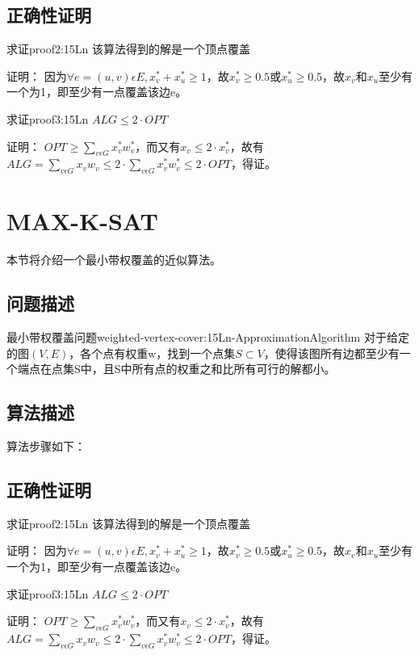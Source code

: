 \subsection{正确性证明}

\begin{proposition}{求证}{proof2:15Ln}
	该算法得到的解是一个顶点覆盖
\end{proposition}
证明：
	因为$\forall e=(u,v)\epsilon E,x_v^*+x_u^*\geqslant 1$，故$x_v^*\geqslant 0.5$或$x_u^*\geqslant 0.5$，故$x_v$和$x_u$至少有一个为1，即至少有一点覆盖该边e。
\begin{proposition}{求证}{proof3:15Ln}
	$ALG\leqslant 2\cdot OPT$
\end{proposition}
证明：
	$OPT\geqslant \sum_{v\epsilon G} x_v^*w_v^*$，而又有$x_v\leqslant 2\cdot x_v^*$，故有
	$ALG=\sum_{v\epsilon G} x_vw_v\leqslant 2\cdot \sum_{v\epsilon G} x_v^*w_v^*\leqslant 2\cdot OPT$，得证。

\section{MAX-K-SAT}


本节将介绍一个最小带权覆盖的近似算法。

\subsection{问题描述}

\begin{definition}{最小带权覆盖问题}{weighted-vertex-cover:15Ln-ApproximationAlgorithm}
	对于给定的图$(V,E)$，各个点有权重w，找到一个点集$S\subset V$，使得该图所有边都至少有一个端点在点集S中，且S中所有点的权重之和比所有可行的解都小。
\end{definition}

\subsection{算法描述}

算法步骤如下：
\begin{enumerate}
	
\end{enumerate}

\subsection{正确性证明}

\begin{proposition}{求证}{proof2:15Ln}
	该算法得到的解是一个顶点覆盖
\end{proposition}
证明：
	因为$\forall e=(u,v)\epsilon E,x_v^*+x_u^*\geqslant 1$，故$x_v^*\geqslant 0.5$或$x_u^*\geqslant 0.5$，故$x_v$和$x_u$至少有一个为1，即至少有一点覆盖该边e。
\begin{proposition}{求证}{proof3:15Ln}
	$ALG\leqslant 2\cdot OPT$
\end{proposition}
证明：
	$OPT\geqslant \sum_{v\epsilon G} x_v^*w_v^*$，而又有$x_v\leqslant 2\cdot x_v^*$，故有
	$ALG=\sum_{v\epsilon G} x_vw_v\leqslant 2\cdot \sum_{v\epsilon G} x_v^*w_v^*\leqslant 2\cdot OPT$，得证。

